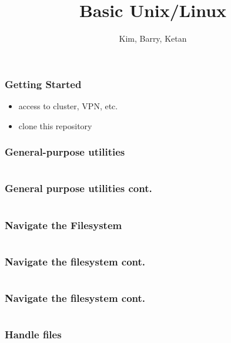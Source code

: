 \documentclass[hyperref={pdfpagelabels=false},12pt]{beamer}
\title[Basic Unix/Linux]{{Basic Unix/Linux}}
\author[Basic Unix/Linux]{{Kim, Barry, Ketan}}
\date{}
\begin{document}
\begin{frame}[plain]
\titlepage
\end{frame}

\begin{frame}
\frametitle{Getting Started}
\centering
\begin{itemize}
    \item access to cluster, VPN, etc.
    \item clone this repository
\end{itemize}
\end{frame}



\begin{frame}
\frametitle{General-purpose utilities}
\centering
\inputminted[bgcolor=lightgray,linenos,fontsize=\footnotesize]{bash}{code/general-purpose-utilities-1.txt}
\end{frame}

\begin{frame}
\frametitle{General purpose utilities cont.}
\centering
\inputminted[bgcolor=lightgray,linenos,fontsize=\footnotesize]{bash}{code/general-purpose-utilities-2.txt}
\end{frame}

\begin{frame}
\frametitle{Navigate the Filesystem}
\centering
\inputminted[bgcolor=lightgray,linenos,fontsize=\footnotesize]{bash}{code/navigate-the-filesystem-1.txt}
\end{frame}

\begin{frame}
\frametitle{Navigate the filesystem cont.}
\centering
\inputminted[bgcolor=lightgray,linenos,fontsize=\footnotesize]{bash}{code/navigate-the-filesystem-2.txt}
\end{frame}

\begin{frame}
\frametitle{Navigate the filesystem cont.}
\centering
\inputminted[bgcolor=lightgray,linenos,fontsize=\footnotesize]{bash}{code/navigate-the-filesystem-3.txt}
\end{frame}

\begin{frame}
\frametitle{Handle files}
\centering
\end{frame}
\end{document}
